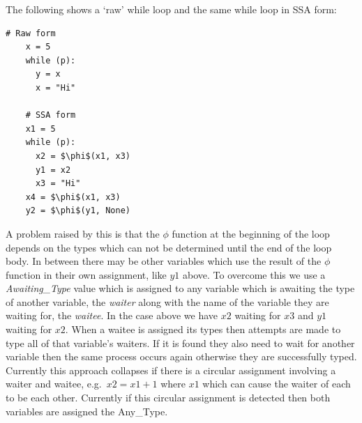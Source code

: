 \documentclass[12pt, titlepage]{article}
\begin{document}
The following shows a `raw' while loop and the same while loop in SSA form:
\begin{lstlisting}[mathescape]
    # Raw form
    x = 5
    while (p):
      y = x
      x = "Hi"
	
    # SSA form
    x1 = 5
    while (p):
      x2 = $\phi$(x1, x3)
      y1 = x2
      x3 = "Hi"
    x4 = $\phi$(x1, x3)
    y2 = $\phi$(y1, None)
\end{lstlisting}
A problem raised by this is that the $\phi$ function at the beginning of the loop depends on the types which can not be determined until the end of the loop body. In between there may be other variables which use the result of the $\phi$ function in their own assignment, like $y1$ above. To overcome this we use a \textit{Awaiting\_Type} value which is assigned to any variable which is awaiting the type of another variable, the \textit{waiter} along with the name of the variable they are waiting for, the \textit{waitee}. In the case above we have $x2$ waiting for $x3$ and $y1$ waiting for $x2$. When a waitee is assigned its types then attempts are made to type all of that variable's waiters. If it is found they also need to wait for another variable then the same process occurs again otherwise they are successfully typed. Currently this approach collapses if there is a circular assignment involving a waiter and waitee, e.g.\ $x2 = x1 + 1$ where $x1$ which can cause the waiter of each to be each other. Currently if this circular assignment is detected then both variables are assigned the Any\_Type.
\end{document}
